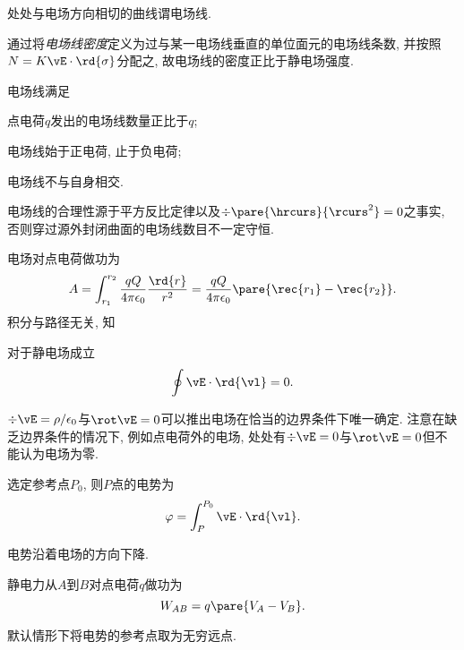 \documentclass[../Electromagnetism.tex]{subfiles}
\begin{document}
\begin{definition}[电场线]
	处处与电场方向相切的曲线谓电场线.
\end{definition}
通过将\emph{电场线密度}定义为过与某一电场线垂直的单位面元的电场线条数, 并按照$N=K\vE\cdot\rd{\sigma}$分配之, 故电场线的密度正比于静电场强度.
\begin{finale}
	\begin{corollary}[电场线的性质]
		\label{coll:电场线的性质}
		电场线满足
		\begin{cenum}
			\item 点电荷$q$发出的电场线数量正比于$q$;
			\item 电场线始于正电荷, 止于负电荷;
			\item 电场线不与自身相交.
		\end{cenum}
	\end{corollary}
\end{finale}
\begin{remark}
	电场线的合理性源于平方反比定律以及$\div\pare{\hrcurs}{\rcurs^2}=0$之事实, 否则穿过源外封闭曲面的电场线数目不一定守恒.
\end{remark}
电场对点电荷做功为
\[ A = \int_{r_1}^{r_2} \frac{qQ}{4\pi\epsilon_0}\frac{\rd{r}}{r^2} = \frac{qQ}{4\pi\epsilon_0}\pare{\rec{r_1} - \rec{r_2}}. \]
积分与路径无关, 知
\begin{corollary}[Kirchhoff定律]
	对于静电场成立
	\begin{equation}
		\label{eq:Kirchhoff定律}
		\oint \vE\cdot\rd{\vl} = 0.
	\end{equation}
\end{corollary}
\begin{remark}
	$\div \vE = \rho/\epsilon_0$与$\rot \vE = 0$可以推出电场在恰当的边界条件下唯一确定. 注意在缺乏边界条件的情况下, 例如点电荷外的电场, 处处有$\div \vE = 0$与$\rot \vE = 0$但不能认为电场为零.
\end{remark}
\begin{definition}[电势]
	选定参考点$P_0$, 则$P$点的电势为
	\[ \varphi = \int_P^{P_0} \vE\cdot\rd{\vl}. \]
\end{definition}
\begin{pitfall}
	电势沿着电场的方向下降.
\end{pitfall}
\begin{corollary}[电势与功]
	静电力从$A$到$B$对点电荷$q$做功为
	\[ W_{AB} = q\pare{V_A - V_B}. \]
\end{corollary}
\begin{remark}
	默认情形下将电势的参考点取为无穷远点.
\end{remark}
\end{document}
